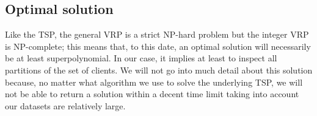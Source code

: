 \subsection{Optimal solution} \label{algorithm-vrp-optimal}
Like the \acrshort*{TSP}, the general \acrshort*{VRP} is a strict NP-hard problem but the integer \acrshort*{VRP} is NP-complete; this means that, to this date, an optimal solution will necessarily be at least \gls{superpolynomial}. In our case, it implies at least to inspect all partitions of the set of clients. We will not go into much detail about this solution because, no matter what algorithm we use to solve the underlying \acrshort*{TSP}, we will not be able to return a solution within a decent time limit taking into account our datasets are relatively large.
